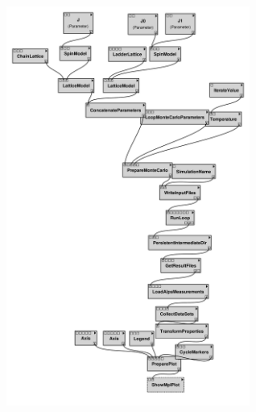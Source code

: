 \href{http://alps.comp-phys.org/vistrails/download.php?getvt=10&db=vistrails&host=alps.ethz.ch&port=3306&tag=&execute=False&showspreadsheetonly=False&embedWorkflow=False&version=163}{\includegraphics[width=8cm]{vistrails_images/alps.ethz.ch_vistrails_3306_10_163_pdf_graph/graph_10_163.pdf}
}